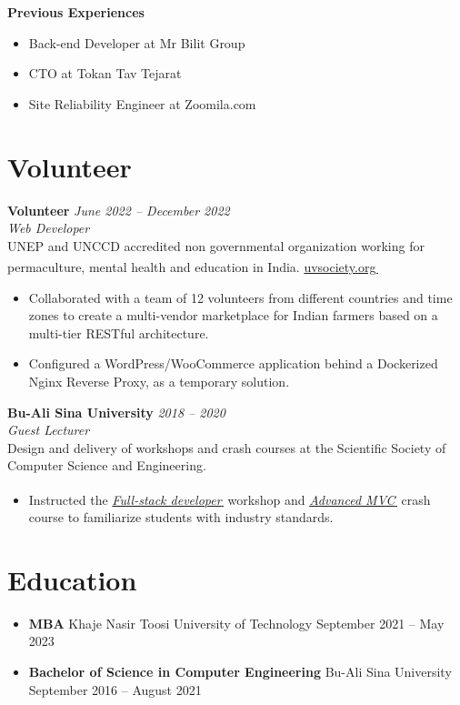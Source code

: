 \documentclass[9pt,a4paper]{article}
\let\orighref\href
\renewcommand{\href}[2]{\orighref{#1}{#2\,{\textsuperscript{\tiny{\textcolor{heritagered}{\faExternalLink}}}}}}
\newlength{\ListLeftMargin}   \setlength{\ListLeftMargin}{0.15in}
\newlength{\ListTopSep}      \setlength{\ListTopSep}{0pt}
\newlength{\ListItemSep}     \setlength{\ListItemSep}{3pt}
\newlength{\ListParsep}      \setlength{\ListParsep}{0pt}
\newcommand{\deemph}[1]{{\color{gray}#1}}
\newcommand{\PositionHeader}[4]{%
  \vspace{2pt}%
  \noindent\textbf{#1} \hfill \textit{\small\deemph{\textcolor{marineblue}{#4}}} \\%
  \noindent\textit{\small #3} \\%
  \noindent\small\deemph{#2}%
  \vspace{4pt}%
}
\begin{document}
\vspace{2pt}
\noindent\textbf{Previous Experiences}
\begin{itemize}[leftmargin=\ListLeftMargin, topsep=\ListTopSep, itemsep=\ListItemSep, parsep=\ListParsep]
  \item Back-end Developer at Mr Bilit Group
  \item CTO at Tokan Tav Tejarat
  \item Site Reliability Engineer at Zoomila.com
\end{itemize}

\section{Volunteer}

\PositionHeader{ Volunteer}{UNEP and UNCCD accredited non governmental organization working for permaculture, mental health and education in India. \href{https://uvsociety.org}{uvsociety.org}}{Web Developer}{June 2022 -- December 2022}
\begin{itemize}[leftmargin=\ListLeftMargin, topsep=\ListTopSep, itemsep=\ListItemSep, parsep=\ListParsep]
  \item Collaborated with a team of 12 volunteers from different countries and time zones to create a multi-vendor marketplace for Indian farmers based on a multi-tier RESTful architecture.
  \item Configured a WordPress/WooCommerce application behind a Dockerized Nginx Reverse Proxy, as a temporary solution.
\end{itemize}

\PositionHeader{Bu-Ali Sina University}{Design and delivery of workshops and crash courses at the Scientific Society of Computer Science and Engineering.}{Guest Lecturer}{2018 -- 2020}
\begin{itemize}[leftmargin=\ListLeftMargin, topsep=\ListTopSep, itemsep=\ListItemSep, parsep=\ListParsep]
  \item Instructed the \href{https://github.com/tayyebi/BASU-Full-Stack-98}{\emph{Full-stack developer}} workshop and \href{https://github.com/tayyebi/BASU-MVC-99}{\emph{Advanced MVC}} crash course to familiarize students with industry standards.
\end{itemize}

\section{Education}
\begin{itemize}[leftmargin=\ListLeftMargin, label={}]
  \item \textbf{MBA} \hfill Khaje Nasir Toosi University of Technology \hfill September 2021 -- May 2023
  \item \textbf{Bachelor of Science in Computer Engineering} \hfill Bu-Ali Sina University \hfill September 2016 -- August 2021
\end{itemize}
\end{document}
